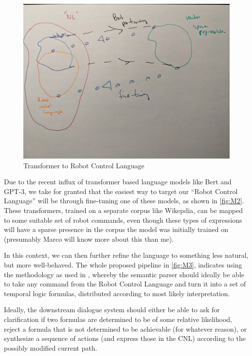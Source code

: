 \documentclass{article}
\begin{document}
\begin{figure}
\centering
\includegraphics[width=150mm]{pics/two.jpg}
\caption{Transformer to Robot Control Language}\label{fig:M2}
\end{figure}

Due to the recent influx of transformer based language models like Bert and
GPT-3, we take for granted that the easiest way to target our ``Robot Control
Language'' will be through fine-tuning one of these models, as shown in
\autoref{fig:M2}. These transformers, trained on a separate corpus like
Wikepdia, can be mapped to some suitable set of robot commands, even though
these types of expressions will have a sparse presence in the corpus the model
was initially trained on (presumably Marco will know more about this than me).

In this context, we can then further refine the language to something less
natural, but more well-behaved. The whole proposed pipeline in \autoref{fig:M3},
indicates using the methodology as used in \cite{fewShotSem}, whereby the
semantic parser should ideally be able to take any command from the Robot
Control Language and turn it into a set of temporal logic formulas, distributed
according to most likely interpretation.

Ideally, the downstream dialogue system should either be able to ask for
clarification if two formulas are determined to be of some relative likelihood,
reject a formula that is not determined to be achievable (for whatever reason),
or synthesize a sequence of actions (and express those in the CNL) according to
the possibly modified current path.
\end{document}
